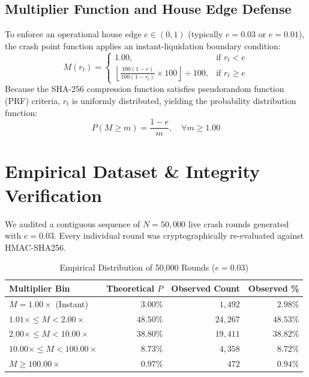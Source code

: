 \documentclass[10pt,journal,compsoc,twocolumn]{article}
\begin{document}
\subsection{Multiplier Function and House Edge Defense}
To enforce an operational house edge $e \in (0, 1)$ (typically $e = 0.03$ or $e = 0.01$), the crash point function applies an instant-liquidation boundary condition:
\begin{equation}
    M(r_t) = \begin{cases}
    1.00, & \text{if } r_t < e \\
    \left\lfloor \frac{100(1 - e)}{100(1 - r_t)} \times 100 \right\rfloor \div 100, & \text{if } r_t \ge e
    \end{cases}
\end{equation}
Because the SHA-256 compression function satisfies pseudorandom function (PRF) criteria, $r_t$ is uniformly distributed, yielding the probability distribution function:
\begin{equation}
    P(M \ge m) = \frac{1 - e}{m}, \quad \forall m \ge 1.00
\end{equation}

\section{Empirical Dataset & Integrity Verification}
We audited a contiguous sequence of $N = 50{,}000$ live crash rounds generated with $e = 0.03$. Every individual round was cryptographically re-evaluated against HMAC-SHA256.

\begin{table}[ht]
\centering
\small
\caption{Empirical Distribution of 50,000 Rounds ($e = 0.03$)}
\label{tab:distribution}
\begin{tabularx}{\columnwidth}{lrrr}
\toprule
\textbf{Multiplier Bin} & \textbf{Theoretical $P$} & \textbf{Observed Count} & \textbf{Observed \%} \\
\midrule
$M = 1.00\times$ (Instant) & $3.00\%$ & $1{,}492$ & $2.98\%$ \\
$1.01\times \le M < 2.00\times$ & $48.50\%$ & $24{,}267$ & $48.53\%$ \\
$2.00\times \le M < 10.00\times$ & $38.80\%$ & $19{,}411$ & $38.82\%$ \\
$10.00\times \le M < 100.00\times$ & $8.73\%$ & $4{,}358$ & $8.72\%$ \\
$M \ge 100.00\times$ & $0.97\%$ & $472$ & $0.94\%$ \\
\bottomrule
\end{tabularx}
\end{table}
\end{document}
